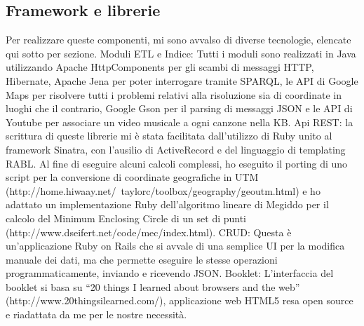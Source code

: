 \documentclass[sigproc-sp.tex]{subfiles}
\begin{document}
\subsection{Framework e librerie}
Per realizzare queste componenti, mi sono avvalso di diverse tecnologie, elencate qui sotto per sezione.
Moduli ETL e Indice: Tutti i moduli sono realizzati in Java utilizzando Apache HttpComponents per gli scambi di messaggi HTTP, Hibernate, Apache Jena per poter interrogare tramite SPARQL, le API di Google Maps per risolvere tutti i problemi relativi alla risoluzione sia di coordinate in luoghi che il contrario, Google Gson per il parsing di messaggi JSON e le API di Youtube per associare un video musicale a ogni canzone nella KB.
Api REST: la scrittura di queste librerie mi è stata facilitata dall’utilizzo di Ruby unito al framework Sinatra, con l’ausilio di ActiveRecord e del linguaggio di templating RABL. Al fine di eseguire alcuni calcoli complessi, ho eseguito il porting di uno script per la conversione di coordinate geografiche in UTM (http://home.hiwaay.net/~taylorc/toolbox/geography/geoutm.html) e ho adattato un implementazione Ruby dell’algoritmo lineare di Megiddo per il calcolo del Minimum Enclosing Circle di un set di punti (http://www.dseifert.net/code/mec/index.html).
CRUD: Questa è un’applicazione Ruby on Rails che si avvale di una semplice UI per la modifica manuale dei dati, ma che permette eseguire le stesse operazioni programmaticamente, inviando e ricevendo JSON.
Booklet: L’interfaccia del booklet si basa su “20 things I learned about browsers and the web” (http://www.20thingsilearned.com/), applicazione web HTML5 resa open source e riadattata da me per le nostre necessità.
\end{document}
